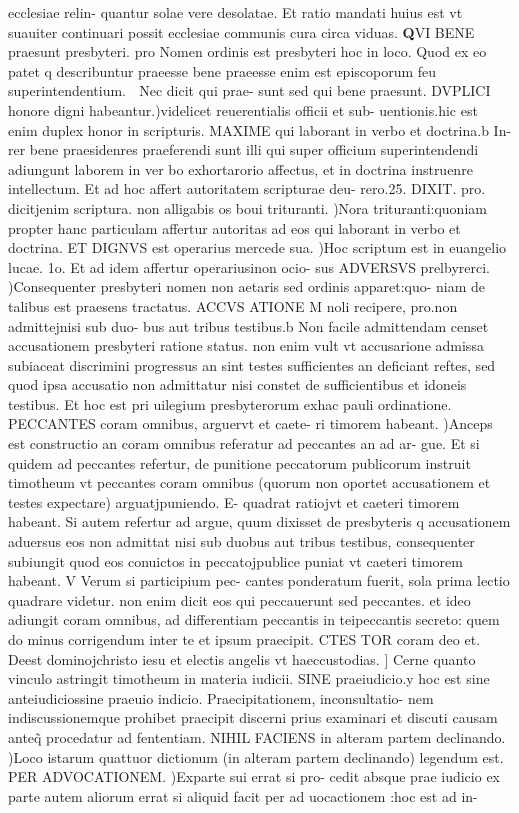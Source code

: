 \documentclass{article}
\begin{document}
\begin{pages}
ecclesiae relin- quantur solae vere desolatae. Et ratio mandati huius est vt suauiter continuari possit ecclesiae communis cura circa viduas.  \pend\pstart \huge\textbf{Q}\normalsize VI BENE praesunt presbyteri. pro Nomen ordinis est presbyteri hoc in loco. Quod ex eo patet q describuntur praeesse bene praeesse enim est episcoporum feu superintendentium.  Nec dicit qui prae- sunt sed qui bene praesunt. DVPLICI honore digni habeantur.)videlicet reuerentialis officii et sub- uentionis.hic est enim duplex honor in scripturis. MAXIME qui laborant in verbo et doctrina.b In- rer bene praesidenres praeferendi sunt illi qui super officium superintendendi adiungunt laborem in ver bo exhortarorio affectus, et in doctrina instruenre intellectum. Et ad hoc affert autoritatem scripturae deu- rero.25. DIXIT. pro. dicitjenim scriptura. non alligabis os boui trituranti. )Nora trituranti:quoniam propter hanc particulam affertur autoritas ad eos qui laborant in verbo et doctrina. ET DIGNVS est operarius mercede sua. )Hoc scriptum est in euangelio lucae. 1o. Et ad idem affertur operariusinon ocio- sus ADVERSVS prelbyrerci. )Consequenter presbyteri nomen non aetaris sed ordinis apparet:quo- niam de talibus est praesens tractatus. ACCVS ATIONE M noli recipere, pro.non admittejnisi sub duo- bus aut tribus testibus.b Non facile admittendam censet accusationem presbyteri ratione status. non enim vult vt accusarione admissa subiaceat discrimini progressus an sint testes sufficientes an deficiant reftes, sed quod ipsa accusatio non admittatur nisi constet de sufficientibus et idoneis testibus. Et hoc est pri uilegium presbyterorum exhac pauli ordinatione. PECCANTES coram omnibus, arguervt et caete- ri timorem habeant. )Anceps est constructio an coram omnibus referatur ad peccantes an ad ar- gue. Et si quidem ad peccantes refertur, de punitione peccatorum publicorum instruit timotheum vt peccantes coram omnibus (quorum non oportet accusationem et testes expectare) arguatjpuniendo. E- quadrat ratiojvt et caeteri timorem habeant. Si autem refertur ad argue, quum dixisset de presbyteris q accusationem aduersus eos non admittat nisi sub duobus aut tribus testibus, consequenter subiungit quod eos conuictos in peccatojpublice puniat vt caeteri timorem habeant. V Verum si participium pec- cantes ponderatum fuerit, sola prima lectio quadrare videtur. non enim dicit eos qui peccauerunt sed peccantes. et ideo adiungit coram omnibus, ad differentiam peccantis in teipeccantis secreto: quem do minus corrigendum inter te et ipsum praecipit. CTES TOR coram deo et. Deest dominojchristo iesu et electis angelis vt haeccustodias. ] Cerne quanto vinculo astringit timotheum in materia iudicii. SINE praeiudicio.y hoc est sine anteiudiciossine praeuio indicio. Praecipitationem, inconsultatio- nem indiscussionemque prohibet praecipit discerni prius examinari et discuti causam anteq̃ procedatur ad fententiam. NIHIL FACIENS in alteram partem declinando. )Loco istarum quattuor dictionum (in alteram partem declinando) legendum est. PER ADVOCATIONEM. )Exparte sui errat si pro- cedit absque prae iudicio ex parte autem aliorum errat si aliquid facit per ad uocactionem :hoc est ad in-\pend 

\end{pages}
\end{document}
